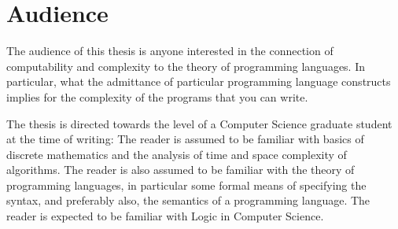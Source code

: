 
\section{Audience}

The audience of this thesis is anyone interested in the connection of
computability and complexity to the theory of programming languages. In
particular, what the admittance of particular programming language constructs
implies for the complexity of the programs that you can write.

The thesis is directed towards the level of a Computer Science graduate student
at the time of writing: The reader is assumed to be familiar with basics of
discrete mathematics and the analysis of time and space complexity of
algorithms. The reader is also assumed to be familiar with the theory of
programming languages, in particular some formal means of specifying the
syntax, and preferably also, the semantics of a programming language. The
reader is expected to be familiar with Logic in Computer Science.
